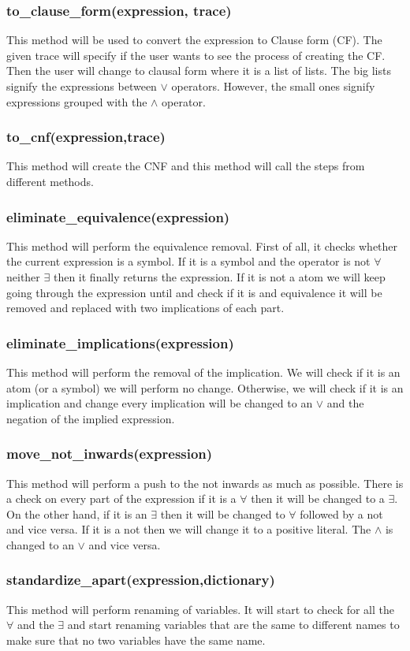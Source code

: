 {\subsubsection{to\_clause\_form(expression, trace)}
This method will be used to convert the expression to Clause form (CF). The given trace will specify if the user wants to see the process of creating the CF. Then the user will change to clausal form where it is a list of lists. The big lists signify the expressions between $\vee$ operators. However, the small ones signify expressions grouped with the $\wedge$ operator.
\subsubsection{to\_cnf(expression,trace)}
This method will create the CNF and this method will call the steps from different methods.
\subsubsection{eliminate\_equivalence(expression)}
This method will perform the equivalence removal. First of all, it checks whether the current expression is a symbol. If it is a symbol and the operator is not $\forall$ neither $\exists$ then it finally returns the expression. If it is not a atom we will keep going through the expression until and check if it is and equivalence it will be removed and replaced with two implications of each part.
\subsubsection{eliminate\_implications(expression)}
This method will perform the removal of the implication. We will check if it is an atom (or a symbol) we will perform no change. Otherwise, we will check if it is an implication and change every implication will be changed to an $\vee$ and the negation of the implied expression.
\subsubsection{move\_not\_inwards(expression)}
This method will perform a push to the not inwards as much as possible. There is a check on every part of the expression if it is a $\forall$ then it will be changed to a $\exists$. On the other hand, if it is an $\exists$ then it will be changed to $\forall$ followed by a not and vice versa. If it is a not then we will change it to a positive literal. The $\wedge$ is changed to an $\vee$ and vice versa.
\subsubsection{standardize\_apart(expression,dictionary)}
This method will perform renaming of variables. It will start to check for all the $\forall$ and the $\exists$ and start renaming variables that are the same to different names to make sure that no two variables have the same name.
}
